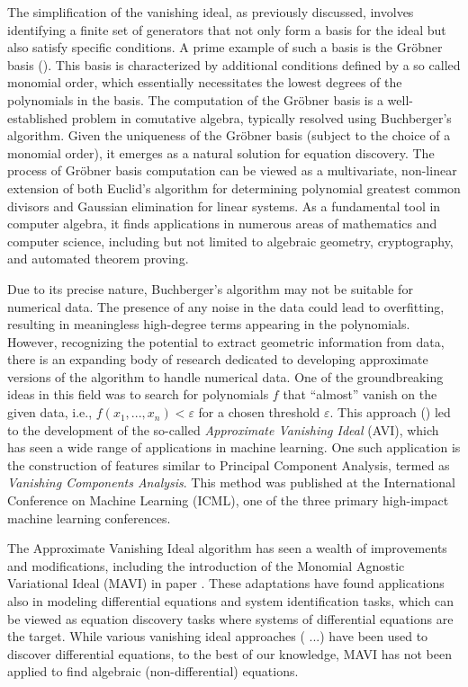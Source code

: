 \documentclass[runningheads]{llncs}
\begin{document}
The simplification of the vanishing ideal, as previously discussed, involves identifying a finite set of generators that not only form a basis for the ideal but also satisfy specific conditions. A prime example of such a basis is the Gröbner basis (\cite{}). 
This basis is characterized by additional conditions defined by a so called monomial order, which essentially necessitates the lowest degrees of the polynomials in the basis.
The computation of the Gröbner basis is a well-established problem in 
comutative algebra, 
typically resolved using Buchberger’s algorithm. 
Given the uniqueness of the Gröbner basis (subject to the choice of a monomial order), 
it emerges as a natural solution for equation discovery.
The process of Gröbner basis computation can be viewed as a multivariate, non-linear extension of both Euclid’s algorithm for determining polynomial greatest common divisors and Gaussian elimination for linear systems. As a fundamental tool in computer algebra, it finds applications in numerous areas of mathematics and computer science, including but not limited to algebraic geometry, cryptography, and automated theorem proving.

Due to its precise nature, Buchberger’s algorithm may not be suitable for numerical data. The presence of any noise in the data could lead to overfitting, resulting in meaningless high-degree terms appearing in the polynomials. However, recognizing the potential to extract geometric information from data, there is an expanding body of research dedicated to developing approximate versions of the algorithm to handle numerical data.
One of the groundbreaking ideas in this field was to search for polynomials $f$ that “almost” vanish on the given data, i.e.,
$f(x_1, ..., x_n) < \varepsilon$ for a chosen threshold $\varepsilon$.
This approach (\cite{aviPokutta2009}) led to the development of the so-called 
\textsl{Approximate Vanishing Ideal} (AVI), which has seen a wide range of applications in machine learning.
One such application is the construction of features similar to Principal Component Analysis, termed as \textsl{Vanishing Components Analysis}. This method was published at the International Conference on Machine Learning (ICML), one of the three primary high-impact machine learning conferences.


The Approximate Vanishing Ideal algorithm has seen a wealth of improvements and modifications, including the introduction of the Monomial Agnostic Variational Ideal (MAVI) in paper \cite{kera2023monomialagnostic}. 
These adaptations have found applications also in modeling differential equations and system identification tasks, which can be viewed as equation discovery tasks where systems of differential equations are the target.
While various vanishing ideal approaches (\cite{} ...) have been used to discover differential equations, to the best of our knowledge, MAVI has not been applied to find algebraic (non-differential) equations.
\end{document}
